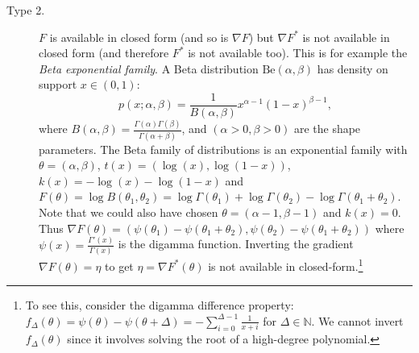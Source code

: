 \documentclass[graybox]{svmult}
\def\bbN{\mathbb{N}}
\begin{document}
\begin{description}
\item[Type 2.]  $F$ is available in closed form (and so is $\nabla F$) but $\nabla F^*$ is not available in closed form (and therefore $F^*$ is not available too).
This is for example the {\em  Beta exponential family}. 
A Beta distribution $\mathrm{Be}(\alpha,\beta)$ has density on support $x\in (0,1)$:
\begin{equation}
p(x;\alpha,\beta)=\frac{1}{B(\alpha,\beta)}x^{\alpha-1}(1-x)^{\beta-1},
\end{equation}
where $B(\alpha,\beta)=\frac{\Gamma(\alpha)\Gamma(\beta)}{\Gamma(\alpha+\beta)}$, and $(\alpha>0,\beta>0)$ are the shape parameters.
The Beta family of distributions is an exponential family with $\theta=(\alpha,\beta)$, $t(x)=(\log(x),\log(1-x))$, $k(x)=-\log(x)-\log(1-x)$ and
$F(\theta)=\log B(\theta_1,\theta_2)=\log\Gamma(\theta_1)+\log\Gamma(\theta_2)-\log\Gamma(\theta_1+\theta_2)$.
Note that we could also have chosen $\theta=(\alpha-1,\beta-1)$ and $k(x)=0$.
Thus $\nabla F(\theta)=(\psi(\theta_1)-\psi(\theta_1+\theta_2),\psi(\theta_2)-\psi(\theta_1+\theta_2))$ where $\psi(x)=\frac{\Gamma'(x)}{\Gamma(x)}$ is the digamma function. 
Inverting the gradient $\nabla F(\theta)=\eta$ to get $\eta=\nabla F^*(\theta)$ is not available in closed-form.\footnote{To see this, consider the digamma difference property: $f_\Delta(\theta)=\psi(\theta)-\psi(\theta+\Delta)=-\sum_{i=0}^{\Delta-1} \frac{1}{x+i}$ for $\Delta\in\bbN$. 
We cannot invert $f_\Delta(\theta)$ since it involves solving the root of a high-degree polynomial.}






\end{description}
\end{document}

